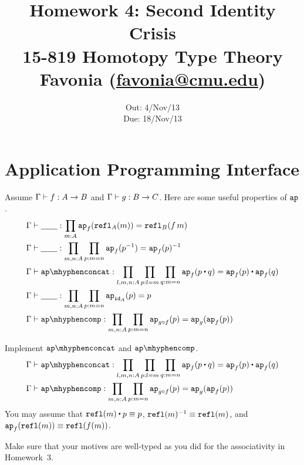 \documentclass[12pt]{article}
\title{\Large\textbf{
  Homework 4: Second Identity Crisis}
\normalsize\\
15-819 Homotopy Type Theory\\
Favonia (\href{mailto:favonia@cmu.edu}{favonia@cmu.edu})}
\author{}
\date{%
Out: 4/Nov/13\\
Due: 18/Nov/13
}
\begin{document}
\maketitle

\section{Application Programming Interface}

Assume
$\Gamma \vdash f : A \to B$ and
$\Gamma \vdash g : B \to C$.
Here are some useful properties of $\mathtt{ap}$.
\begin{align*}
  &\ctx \entails \blank : \prod_{m:A}\ap_f(\refl_A(m)) = \refl_B(f\,m)
  \\
  &\ctx \entails \blank : \prod_{m,n:A}\prod_{p:m=n}\ap_f(p^{-1}) = \ap_f(p)^{-1}
  \\
  &\ctx \entails \apconcat : \prod_{l,m,n:A}\prod_{p:l=m}\prod_{q:m=n}\ap_f(p \concat q) = \ap_f(p) \concat \ap_f(q)
  \\
  &\ctx \entails \blank : \prod_{m,n:A}\prod_{p:m=n}\ap_{\id_A}(p) = p
  \\
  &\ctx \entails \apcomp : \prod_{m,n:A}\prod_{p:m=n}\ap_{g \comp f}(p) = \ap_g(\ap_f(p))
\end{align*}

\pagebreak[2]

\begin{task}
  Implement $\apconcat$ and $\apcomp$.
  \begin{align*}
    &\ctx \entails \apconcat : \prod_{l,m,n:A}\prod_{p:l=m}\prod_{q:m=n}\ap_f(p \concat q) = \ap_f(p) \concat \ap_f(q)
    \\
    &\ctx \entails \apcomp : \prod_{m,n:A}\prod_{p:m=n}\ap_{g \comp f}(p) = \ap_g(\ap_f(p))
  \end{align*}
  You may assume that $\refl(m) \concat p \jdeq p$, $\mathtt{refl}(m)^{-1} \equiv \mathtt{refl}(m)$,
  and $\mathtt{ap}_f(\mathtt{refl}(m)) \equiv \mathtt{refl}(f(m))$.
  \begin{hint}
    Make sure that your motives are well-typed
    as you did for the associativity in Homework~3.
  \end{hint}
\end{task}
\end{document}

